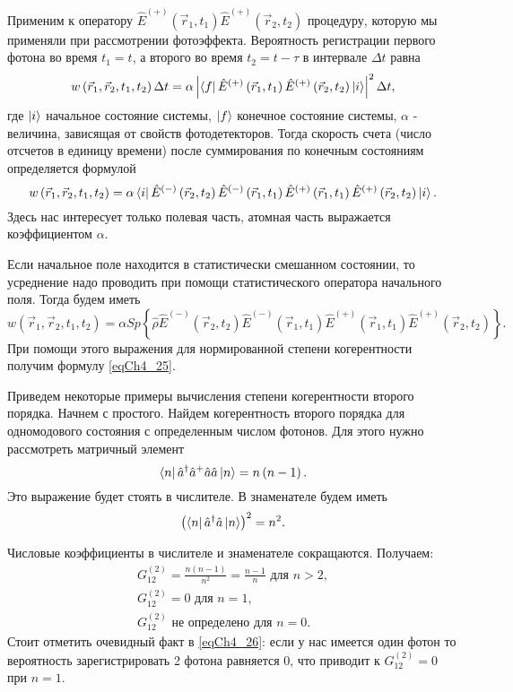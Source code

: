 Применим к оператору $\hat{E}^{(+)}\left(\vec{r}_1, t_1\right)\hat{E}^{(+)}\left(\vec{r}_2,
t_2\right)$ процедуру, которую мы применяли при рассмотрении
фотоэффекта. Вероятность регистрации первого фотона во время $t_1 =
t$, а второго во время $t_2 = t - \tau$ в интервале $\Delta t$ равна
\begin{equation}
w\left(\vec{r}_1, \vec{r}_2, t_1, t_2\right) \Delta t= 
\alpha \left| \bra{f}
\hat{E}^{(+)}\left(\vec{r}_1, t_1\right)\hat{E}^{(+)}\left(\vec{r}_2,
t_2\right)
\ket{i}\right|^2 \Delta t,
\nonumber
\end{equation}
где $\ket{i}$ начальное состояние системы, $\ket{f}$
конечное состояние системы, $\alpha$ - величина, зависящая от свойств
фотодетекторов. Тогда скорость счета (число отсчетов в единицу
времени) после суммирования по конечным состояниям определяется
формулой
\begin{equation}
w\left(\vec{r}_1, \vec{r}_2, t_1, t_2\right) = 
\alpha \bra{i}
\hat{E}^{(-)}\left(\vec{r}_2, t_2\right)\hat{E}^{(-)}\left(\vec{r}_1,
t_1\right)
\hat{E}^{(+)}\left(\vec{r}_1, t_1\right)\hat{E}^{(+)}\left(\vec{r}_2,
t_2\right)
\ket{i}.
\nonumber
\end{equation}
Здесь нас интересует только полевая часть, атомная часть выражается
коэффициентом $\alpha$.

Если начальное поле находится в статистически смешанном состоянии, то
усреднение надо проводить при помощи статистического оператора
начального поля. Тогда будем иметь
\begin{equation}
w\left(\vec{r}_1, \vec{r}_2, t_1, t_2\right) = 
\alpha Sp \left\{\hat{\rho}
\hat{E}^{(-)}\left(\vec{r}_2, t_2\right)\hat{E}^{(-)}\left(\vec{r}_1,
t_1\right)
\hat{E}^{(+)}\left(\vec{r}_1, t_1\right)\hat{E}^{(+)}\left(\vec{r}_2,
t_2\right)
\right\}.
\nonumber
\end{equation}
При помощи этого выражения для нормированной степени
когерентности получим формулу \eqref{eqCh4_25}.

Приведем некоторые примеры вычисления
степени когерентности второго порядка. Начнем с простого. Найдем
когерентность второго порядка для одномодового состояния с
определенным числом фотонов. Для этого нужно рассмотреть матричный
элемент  
\[
\bra{n}\hat{a}^{\dag}\hat{a}^{+}\hat{a}\hat{a}\ket{n} = n
\left(n - 1\right).
\]
Это выражение будет стоять в числителе. В знаменателе будем иметь 
\[
\left(\bra{n}\hat{a}^{\dag}\hat{a}\ket{n}\right)^2 = 
n^2.
\]

Числовые коэффициенты в числителе и знаменателе сокращаются. Получаем:
\begin{eqnarray}
G^{(2)}_{12} = \frac{n\left(n - 1\right)}{n^2} = \frac{n - 1}{n} 
\mbox{ для } n > 2,
\nonumber \\
G^{(2)}_{12} = 0
\mbox{ для } n = 1,
\nonumber \\
G^{(2)}_{12} 
\mbox{ не определено для } n = 0.
\label{eqCh4_26}
\end{eqnarray}
Стоит отметить очевидный факт в \eqref{eqCh4_26}: если у нас имеется
один фотон то вероятность зарегистрировать 2 фотона равняется 0, что
приводит к $G^{(2)}_{12} = 0$ при $n=1$.

